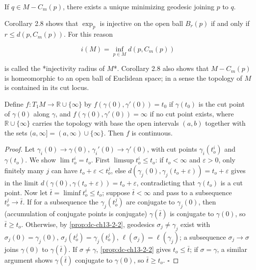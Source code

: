 \begin{corollary}
  \label{cor:dc-ch13-2-8}
  If $q\in M-C_m(p)$, there exists a unique minimizing geodesic joining $p$ to $q$.
  
  Corollary 2.8 shows that $\exp_p$ is injective on the open ball $B_r(p)$ if and only
  if $r\leq d(p,C_m(p))$. For this reason
  
  $$
  i(M)=\inf_{p\in M}d(p,C_m(p))
  $$
  
  is called the *injectivity radius of $M$*. Corollary 2.8 also shows that
  $M-C_m(p)$ is homeomorphic to an open ball of Euclidean space; in a sense the
  topology of $M$ is contained in its cut locus.
\end{corollary}

\begin{proposition}
  \label{prop:dc-ch13-2-9}
  Define $f:T_1M\to\mathbb{R}\cup\{\infty\}$ by $f(\gamma(0),\gamma'(0))=t_0$ if
  $\gamma(t_0)$ is the cut point of $\gamma(0)$ along $\gamma$, and
  $f(\gamma(0),\gamma'(0))=\infty$ if no cut point exists, where $\mathbb{R}\cup\{\infty\}$
  carries the topology with base the open intervals $(a,b)$ together with the sets
  $(a,\infty]=(a,\infty)\cup\{\infty\}$. Then $f$ is continuous.
\end{proposition}
\begin{proof}
  Let $\gamma_i(0)\to\gamma(0)$, $\gamma_i'(0)\to\gamma'(0)$, with cut points
  $\gamma_i(t_o^i)$ and $\gamma(t_o)$. We show $\lim t_o^i=t_o$. First
  $\limsup t_o^i\leq t_o$: if $t_o<\infty$ and $\varepsilon>0$, only finitely many $j$
  can have $t_o+\varepsilon<t_o^j$, else $d(\gamma_j(0),\gamma_j(t_o+\varepsilon))=t_o+\varepsilon$
  gives in the limit $d(\gamma(0),\gamma(t_o+\varepsilon))=t_o+\varepsilon$,
  contradicting that $\gamma(t_o)$ is a cut point. Now let
  $\bar t=\liminf t_o^i\leq t_o$; suppose $\bar t<\infty$ and pass to a subsequence
  $t_o^j\to\bar t$. If for a subsequence the $\gamma_j(t_o^j)$ are conjugate to
  $\gamma_j(0)$, then (accumulation of conjugate points is conjugate) $\gamma(\bar t)$
  is conjugate to $\gamma(0)$, so $\bar t\geq t_o$. Otherwise, by \cref{prop:dc-ch13-2-2},
  geodesics $\sigma_j\neq\gamma_j$ exist with $\sigma_j(0)=\gamma_j(0)$,
  $\sigma_j(t_o^j)=\gamma_j(t_o^j)$, $\ell(\sigma_j)=\ell(\gamma_j)$; a subsequence
  $\sigma_j\to\sigma$ joins $\gamma(0)$ to $\gamma(\bar t)$. If $\sigma\neq\gamma$,
  \cref{prop:dc-ch13-2-2} gives $t_o\leq\bar t$; if $\sigma=\gamma$, a similar argument shows
  $\gamma(\bar t)$ conjugate to $\gamma(0)$, so $\bar t\geq t_o$. $\square$
\end{proof}

